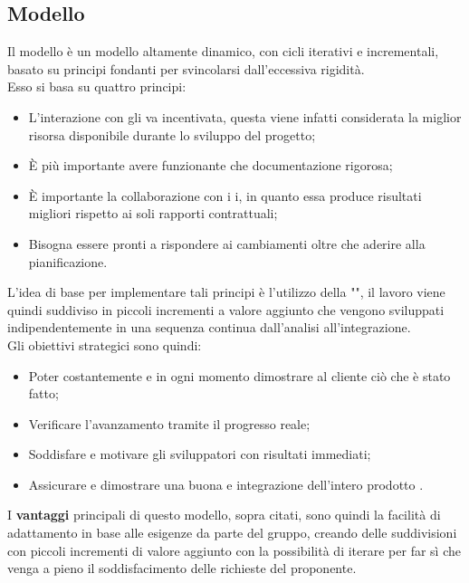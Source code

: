 \subsection{Modello }
Il modello  è un modello altamente dinamico, con cicli iterativi e incrementali, basato su principi fondanti per svincolarsi dall'eccessiva rigidità.\\ Esso si basa su quattro principi:
	\begin{itemize}
		\item L'interazione con gli  va incentivata, questa viene infatti considerata la miglior risorsa disponibile durante lo sviluppo del progetto;
		\item È più importante avere  funzionante che documentazione rigorosa;
		\item È importante la collaborazione con i i, in quanto essa produce risultati migliori rispetto ai soli rapporti contrattuali;
		\item Bisogna essere pronti a rispondere ai cambiamenti oltre che aderire alla pianificazione.
	\end{itemize}
L'idea di base per implementare tali principi è l'utilizzo della {""}, il lavoro viene quindi suddiviso in piccoli incrementi a valore aggiunto che vengono sviluppati indipendentemente in una sequenza continua dall'analisi all'integrazione.\\ Gli obiettivi strategici sono quindi:
	\begin{itemize}
		\item Poter costantemente e in ogni momento dimostrare al cliente ciò che è stato fatto;
		\item Verificare l'avanzamento tramite il progresso reale;
		\item Soddisfare e motivare gli sviluppatori con risultati immediati;
		\item Assicurare e dimostrare una buona  e integrazione dell'intero prodotto . 
	\end{itemize}
I \textbf{vantaggi} principali di questo modello, sopra citati, sono quindi la facilità di adattamento in base alle esigenze da parte del gruppo, creando delle suddivisioni con piccoli incrementi di valore aggiunto con la possibilità di iterare per far sì che venga a pieno il soddisfacimento delle richieste del proponente.
